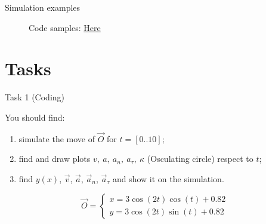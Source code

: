 \documentclass[aspectratio=169]{beamer}
\begin{document}
\begin{frame}[t]{Simulation examples}
\begin{figure}[H]
        \caption*{Code samples: \href{https://colab.research.google.com/drive/10qiTOlywP5XTFUXQ-549huNInDtRE1NT?usp=sharing}{Here}}
        \end{figure}
    \end{frame}

    \section*{Tasks}

\begin{frame}[t]{Task 1 (Coding)}
\begin{minipage}{0.49\textwidth}

    
    You should find:
    \begin{enumerate}
        \item simulate the move of $\vec{O}$ for $t=[0..10]$;
        \item find and draw plots $v,\ a,\ a_n,\ a_\tau,\ \kappa $ (Osculating circle) respect to $t$;
        \item find  $y(x)$, $\vec{v}$, $\vec{a}$, $\vec{a}_n$, $\vec{a}_\tau$ and show it on the simulation.
    \end{enumerate}
    \end{minipage}
    \begin{minipage}{0.49\textwidth}
    \begin{equation*}
        \vec{O} = \left\{\begin{matrix}x = 3\cos(2t)\cos(t)+0.82\\y = 3\cos(2t)\sin(t)+0.82
        \end{matrix}\right.
    \end{equation*}
    \end{minipage}
\end{frame}
\end{document}
